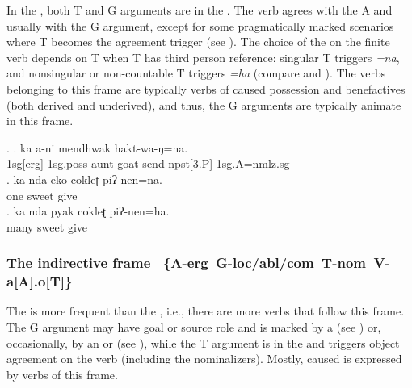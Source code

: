 
\noindent
In the , both T and G arguments are in the  . The verb agrees with the A and usually with the G argument, except for some pragmatically marked scenarios where T becomes the agreement trigger (see ). The choice of the  on the finite verb depends on T when T has third person reference: singular T triggers \emph{=na}, and nonsingular or non-countable T triggers \emph{=ha} (compare \Next[b] and \Next[c]). The verbs belonging to this frame are typically verbs of caused possession and benefactives (both derived and underived), and thus, the G arguments are typically animate in this frame.
 
\ex. \ag. ka  a-ni mendhwak hakt-wa-ŋ=na.\\
{\sc 1sg[erg]} {\sc 1sg.poss}-aunt goat send{\sc -npst[3.P]-1sg.A=nmlz.sg}\\
\newpage
\bg. ka nda eko cokleʈ piʔ-nen=na.\\
		  one sweet give\\
	\bg. ka nda pyak cokleʈ piʔ-nen=ha.\\
	  many sweet give\\

\subsubsection[The indirective frame]{The indirective frame %
\mbox{ \{A-{\sc erg}  G-{\sc loc/abl/com} T-{\sc nom} V-a[A].o[T]\}}}


\largerpage 
\noindent
The  is more frequent than the , i.e., there are more verbs that follow this frame. The G argument may have goal or source role and is marked by a  (see \Next) or, occasionally, by an  or   (see \NNext), while the T argument is in the  and triggers object agreement on the verb (including the nominalizers). Mostly, caused  is  expressed by verbs of this frame. 

